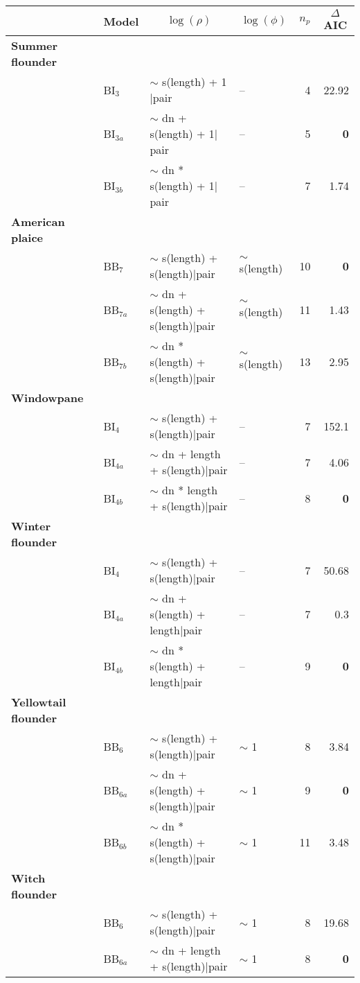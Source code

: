 \begin{center}
\begin{tabular}{llllrr}
\hline\hline
\multicolumn{1}{l}{}&\multicolumn{1}{c}{Model}&\multicolumn{1}{c}{$\log\left(\rho\right)$}&\multicolumn{1}{c}{$\log\left(\phi\right)$}&\multicolumn{1}{c}{$n_p$}&\multicolumn{1}{c}{$\Delta$AIC}\tabularnewline
\hline
{\bfseries Summer flounder}&&&&&\tabularnewline
   ~~&   BI$_{3}$&   $\sim$ s(length) + 1$|$pair&   --&    4&   22.92\tabularnewline
   ~~&   BI$_{3a}$&   $\sim$ dn + s(length) + 1$|$pair&   --&    5&\bfseries   0\tabularnewline
   ~~&   BI$_{3b}$&   $\sim$ dn * s(length) + 1$|$pair&   --&    7&   1.74\tabularnewline
\hline
{\bfseries American plaice}&&&&&\tabularnewline
   ~~&   BB$_{7}$&   $\sim$ s(length) + s(length)$|$pair&   $\sim$ s(length)&   10&\bfseries   0\tabularnewline
   ~~&   BB$_{7a}$&   $\sim$ dn + s(length) + s(length)$|$pair&   $\sim$ s(length)&   11&   1.43\tabularnewline
   ~~&   BB$_{7b}$&   $\sim$ dn * s(length) + s(length)$|$pair&   $\sim$ s(length)&   13&   2.95\tabularnewline
\hline
{\bfseries Windowpane}&&&&&\tabularnewline
   ~~&   BI$_{4}$&   $\sim$ s(length) + s(length)$|$pair&   --&    7&   152.1\tabularnewline
   ~~&   BI$_{4a}$&   $\sim$ dn + length + s(length)$|$pair&   --&    7&   4.06\tabularnewline
   ~~&   BI$_{4b}$&   $\sim$ dn * length + s(length)$|$pair&   --&    8&\bfseries   0\tabularnewline
\hline
{\bfseries Winter flounder}&&&&&\tabularnewline
   ~~&   BI$_{4}$&   $\sim$ s(length) + s(length)$|$pair&   --&    7&   50.68\tabularnewline
   ~~&   BI$_{4a}$&   $\sim$ dn + s(length) + length$|$pair&   --&    7&   0.3\tabularnewline
   ~~&   BI$_{4b}$&   $\sim$ dn * s(length) + length$|$pair&   --&    9&\bfseries   0\tabularnewline
\hline
{\bfseries Yellowtail flounder}&&&&&\tabularnewline
   ~~&   BB$_{6}$&   $\sim$ s(length) + s(length)$|$pair&   $\sim$ 1&    8&   3.84\tabularnewline
   ~~&   BB$_{6a}$&   $\sim$ dn + s(length) + s(length)$|$pair&   $\sim$ 1&    9&\bfseries   0\tabularnewline
   ~~&   BB$_{6b}$&   $\sim$ dn * s(length) + s(length)$|$pair&   $\sim$ 1&   11&   3.48\tabularnewline
\hline
{\bfseries Witch flounder}&&&&&\tabularnewline
   ~~&   BB$_{6}$&   $\sim$ s(length) + s(length)$|$pair&   $\sim$ 1&    8&   19.68\tabularnewline
   ~~&   BB$_{6a}$&   $\sim$ dn + length + s(length)$|$pair&   $\sim$ 1&    8&\bfseries   0\tabularnewline

\end{tabular}
\end{center}
